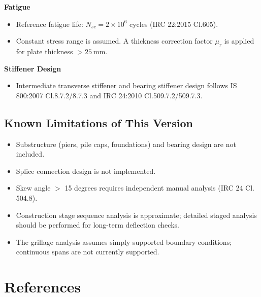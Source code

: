 \documentclass[12pt,a4paper]{report}
\numberwithin{table}{chapter}
\numberwithin{figure}{chapter}
\begin{document}
\textbf{Fatigue}

\begin{itemize}
\item Reference fatigue life: $N_{sc} = 2 \times 10^6$ cycles (IRC 22:2015 Cl.605).
\item Constant stress range is assumed. A thickness correction factor $\mu_r$ is applied for plate thickness $> 25 \ \text{mm}$.
\end{itemize}

\textbf{Stiffener Design}

\begin{itemize}
\item Intermediate transverse stiffener and bearing stiffener design follows IS 800:2007 Cl.8.7.2/8.7.3 and IRC 24:2010 Cl.509.7.2/509.7.3.
\end{itemize}


\section{Known Limitations of This Version}
\label{sec:limitations}

\begin{itemize}
\item Substructure (piers, pile caps, foundations) and bearing design are not included.
\item Splice connection design is not implemented.
\item Skew angle $>$ 15 degrees requires independent manual analysis (IRC 24 Cl. 504.8).
\item Construction stage sequence analysis is approximate; detailed staged analysis
  should be performed for long-term deflection checks.
\item The grillage analysis assumes simply supported boundary conditions;
  continuous spans are not currently supported.
\end{itemize}


\chapter*{References}
\end{document}
